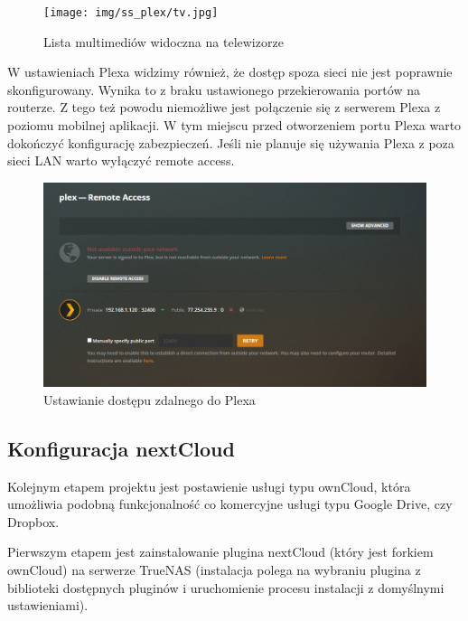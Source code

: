 \documentclass[12pt,a4paper]{article}
\newcommand{\<}{\langle}
\renewcommand{\>}{\rangle}
\theoremstyle{definition}
\begin{document}
\begin{figure}[H]
    \centering
    \texttt{[image: img/ss\_plex/tv.jpg]}
    \caption{Lista multimediów widoczna na telewizorze}
\end{figure}

W ustawieniach Plexa widzimy również, że dostęp spoza sieci nie jest poprawnie skonfigurowany. Wynika to z braku ustawionego przekierowania portów na routerze. Z tego też powodu niemożliwe jest połączenie się z serwerem Plexa z poziomu mobilnej aplikacji. W tym miejscu przed otworzeniem portu Plexa warto dokończyć konfigurację zabezpieczeń. Jeśli nie planuje się używania Plexa z poza sieci LAN warto wyłączyć remote access. 

\begin{figure}[H]
    \centering
    \includegraphics[width=\linewidth]{img/ss_plex/28.png}
    \caption{Ustawianie dostępu zdalnego do Plexa}
\end{figure}


\subsection{Konfiguracja nextCloud}

Kolejnym etapem projektu jest postawienie usługi typu ownCloud, która umożliwia podobną funkcjonalność co komercyjne usługi typu Google Drive, czy Dropbox.

Pierwszym etapem jest zainstalowanie plugina nextCloud (który jest forkiem ownCloud) na serwerze TrueNAS (instalacja polega na wybraniu plugina z biblioteki dostępnych pluginów i uruchomienie procesu instalacji z domyślnymi ustawieniami).
\end{document}
